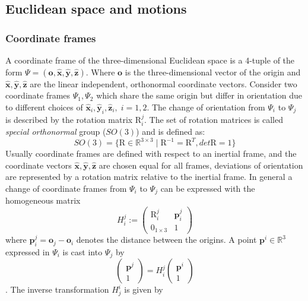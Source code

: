 \documentclass[a4paper,twoside, openright,12pt]{report}
\newcommand{\f}[1]{\boldsymbol{#1}}
\newcommand{\g}[1]{\text{#1}}
\begin{document}
{\subsection{Euclidean space and motions}\label{[SS:euclideanspacemotions]}
\subsubsection{Coordinate frames}
A coordinate frame of the three-dimensional Euclidean space is a 4-tuple of the form $ \Psi = (\f{o},\hat{\f{x}},\hat{\f{y}},\hat{\f{z}})$. Where $ \f{o} $ is the three-dimensional vector of the origin and $ \hat{\f{x}},\hat{\f{y}},\hat{\f{z}} $ are the linear independent, orthonormal coordinate vectors. Consider two coordinate frames $ {\Psi}_1,{\Psi}_2 $ which share the same origin but differ in orientation due to different choices of $ \hat{\f{x}}_i,\hat{\f{y}}_i,\hat{\f{z}}_i, \; i=1,2 $. The change of orientation from $ {\Psi}_i $ to $ {\Psi}_j $ is described by the rotation matrix $ \g{R}_i^j $. The set of rotation matrices is called \emph{special orthonormal} group ($SO(3)$) \cite{Stramigioli_01b} and is defined as:
\begin{equation}
	SO(3) = \{\g{R} \in \mathbb{R}^{3 \times 3} \; | \; \g{R}^{-1} = \g{R}^T, det \g{R} = 1\}
\end{equation}
Usually coordinate frames are defined with respect to an inertial frame, and the coordinate vectors $ \hat{\f{x}},\hat{\f{y}},\hat{\f{z}} $ are chosen equal for all frames, deviations of orientation are represented by a rotation matrix relative to the inertial frame. In general a change of coordinate frames from $ \Psi_i $ to $ \Psi_j $ can be expressed with the homogeneous matrix
\[ H_i^j := \begin{pmatrix}\g{R}_i^j & \f{p}_i^j \\ 0_{1\times3} & 1\end{pmatrix} \]
where $\f{p}_i^j = \f{o}_j - \f{o}_i$ denotes the distance between the origins. A point $ \f{p}^i \in \mathbb{R}^3 $ expressed in $ {\Psi}_i $ is cast into ${\Psi}_j$ by
\begin{equation}\label{EQ:coordchange}
	\begin{pmatrix}\f{p}^j \\ 1\end{pmatrix} = H_i^j \begin{pmatrix}
		\f{p}^i \\ 1\end{pmatrix}
\end{equation}.
The inverse transformation $ H_j^i $ is given by 
}
\end{document}
